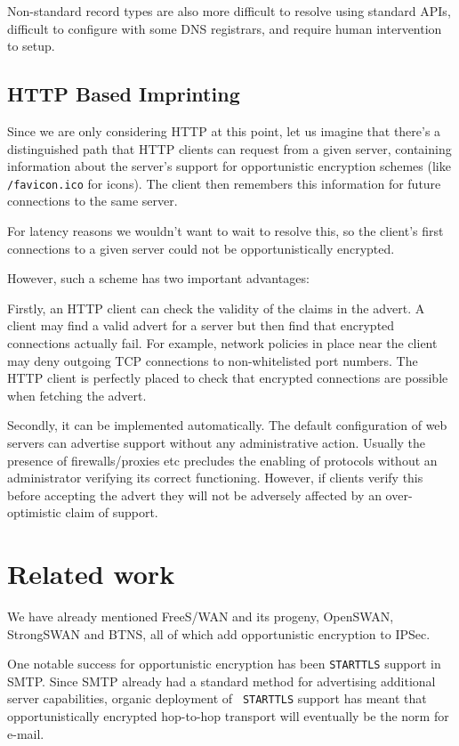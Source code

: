 \documentclass[conference]{IEEEtran}
\begin{document}
Non-standard record types are also more difficult to resolve using standard
APIs, difficult to configure with some DNS registrars, and require human
intervention to setup.

\subsection{HTTP Based Imprinting}

Since we are only considering HTTP at this point, let us imagine that there's a
distinguished path that HTTP clients can request from a given server,
containing information about the server's support for opportunistic encryption
schemes (like {\tt /favicon.ico} for icons). The client then remembers this
information for future connections to the same server.

For latency reasons we wouldn't
want to wait to resolve this, so the client's first connections to a given server
could not be opportunistically encrypted.

However, such a scheme has two important advantages:

Firstly, an HTTP client can check the validity of the claims in the advert. A
client may find a valid advert for a server but then find that encrypted
connections actually fail. For example, network policies in place near the
client may deny outgoing TCP connections to non-whitelisted port numbers. The
HTTP client is perfectly placed to check that encrypted connections are
possible when fetching the advert.

Secondly, it can be implemented automatically. The default configuration of web
servers can advertise support without any administrative action. Usually the
presence of firewalls/proxies etc precludes the enabling of protocols without an
administrator verifying its correct functioning. However, if clients verify
this before accepting the advert they will not be adversely affected by an
over-optimistic claim of support.

\section{Related work}

We have already mentioned FreeS/WAN\cite{freeswan} and its progeny, OpenSWAN,
StrongSWAN and BTNS\cite{btns}, all of which add opportunistic encryption to
IPSec.

One notable success for opportunistic encryption has been {\tt STARTTLS}
support in SMTP\cite{rfc3207}. Since SMTP already had a standard method for
advertising additional server capabilities, organic deployment of {\tt
STARTTLS} support has meant that opportunistically encrypted hop-to-hop
transport will eventually be the norm for e-mail.
\end{document}

